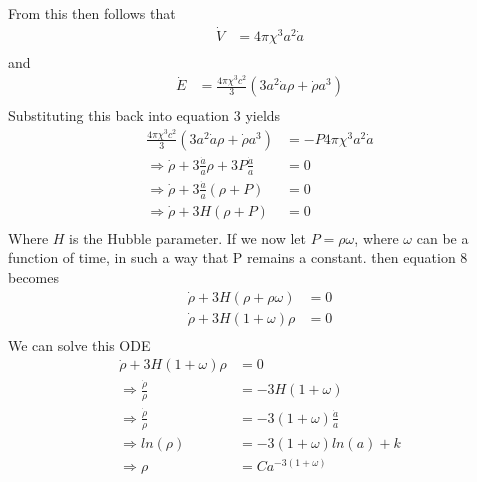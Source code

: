 \documentclass[a4paper, 11pt]{FSKH_623_Report}
\numberwithin{equation}{section}
\begin{document}
From this then follows that
\begin{equation}
\begin{split}
\dot{V} &= 4\pi\chi^{3}a^{2}\dot{a}\\
\end{split}
\end{equation}
and
\begin{equation}
\begin{split}
\dot{E} &= \frac{4\pi\chi^{3} c^{2}}{3}\left(3a^{2}\dot{a}\rho+\dot{\rho}a^{3}\right)\\
\end{split}
\end{equation}
Substituting this back into equation 3 yields
\begin{equation}
\begin{split}
\frac{4\pi\chi^{3} c^{2}}{3}\left(3a^{2}\dot{a}\rho+\dot{\rho}a^{3}\right) &= -P4\pi\chi^{3}a^{2}\dot{a}\\
\Rightarrow \dot{\rho}+3\frac{\dot{a}}{a}\rho+3P\frac{\dot{a}}{a} &= 0\\
\Rightarrow \dot{\rho}+3\frac{\dot{a}}{a}\left(\rho+P\right) &= 0\\
\Rightarrow \dot{\rho}+3H\left(\rho+P\right) &= 0\\
\end{split}
\end{equation}
Where $H$ is the Hubble parameter.
If we now let $P=\rho\omega$, where $\omega$ can be a function of time, in such a way that P remains a constant.
then equation 8 becomes
\begin{equation}
\begin{split}
\dot{\rho}+3H\left(\rho+\rho\omega\right) &= 0\\
\dot{\rho}+3H\left(1+\omega\right)\rho &= 0\\
\end{split}
\end{equation}
We can solve this ODE 
\begin{equation}
\begin{split}
\dot{\rho}+3H\left(1+\omega\right)\rho &= 0\\
\Rightarrow \frac{\dot{\rho}}{\rho} &= -3H\left(1+\omega\right)\\
\Rightarrow \frac{\dot{\rho}}{\rho} &= -3\left(1+\omega\right)\frac{\dot{a}}{a}\\
\Rightarrow ln(\rho) &= -3\left(1+\omega\right)ln(a) + k\\
\Rightarrow \rho &= Ca^{-3\left(1+\omega\right)}
\end{split}
\end{equation}
\end{document}
